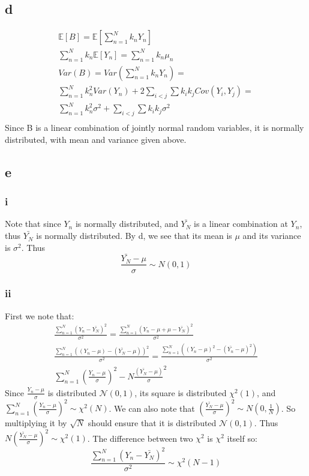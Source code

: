 \documentclass[10pt,letterpaper]{paper}
\newcommand*{\ex}{\mathbb{E}}
\begin{document}
\subsection*{d}
\begin{align*}
  \ex [B] = \ex [\sum_{n=1}^N k_n Y_n ]\\
  \sum_{n=1}^N k_n \ex [Y_n] = \sum_{n=1}^N k_n \mu_n\\
  Var(B) = Var( \sum_{n=1}^N k_n Y_n ) =\\
  \sum_{n=1}^N k_n^2 Var(Y_n) + 2\sum_{i< j}\sum k_ik_j Cov(Y_i, Y_j)=\\
  \sum_{n=1}^N k_n^2 \sigma^2 + \sum_{i<j}\sum k_ik_j \sigma^2\\
\end{align*}
Since B is a linear combination of jointly normal random variables, it is
normally distributed, with mean and variance given above.
\subsection*{e}

\subsubsection*{i}


Note that since $Y_n$ is normally distributed, and $\bar{Y_N}$ is a linear
combination at $Y_n$, thus $\bar{Y_N}$ is normally distributed. By d, we see
that its mean is $\mu$ and its variance is $\sigma^2$. Thus
$$\frac{\bar{Y_N} - \mu}{\sigma} \sim N(0,1)$$

\subsubsection*{ii}



First we note that:
\begin{align*}
  \frac{\sum_{n=1}^N(Y_n - \bar{ Y_N})^2}{\sigma^2} = \frac{\sum_{n=1}^N(Y_n - \mu + \mu - \bar{Y_N} )^2}{\sigma^2}\\
  \frac{\sum_{n=1}^N((Y_n - \mu )-(\bar{Y_N} - \mu ))^2}{\sigma^2} = \frac{\sum_{n=1}^N((Y_n - \mu)^2 - (\bar{Y_n} - \mu)^2 )}{\sigma^2}\\
  \sum_{n=1}^N (\frac{Y_n - \mu}{\sigma})^2 - N \frac{(\bar{Y_N} - \mu)}{\sigma}^2
\end{align*}
Since  $\frac{Y_n - \mu}{\sigma}$ is distributed $\mathcal{N} (0,1)$, its square is distributed
$\chi^2(1)$, and $\sum_{n=1}^N (\frac{Y_n - \mu}{\sigma})^2 \sim \chi^2(N)$. We can also note that
$(\frac{\bar{Y_N} - \mu}{\sigma})^2 \sim N(0,\frac{1}{N})$. So multiplying it by $\sqrt{N}$ should
ensure that it is distributed $\mathcal{N} (0,1)$. Thus $N (\frac{ \bar{Y_N} -
    \mu}{\sigma})^2 \sim \chi^2(1)$. The difference between two $\chi^2$ is $\chi^2$ itself so: $$\frac{\sum_{n=1}^N(Y_n - \bar{ Y_N})^2}{\sigma^2} \sim \chi^2(N-1)$$
\end{document}
